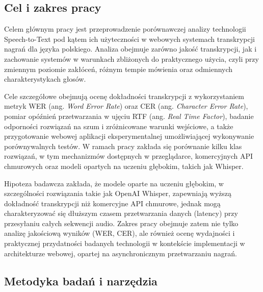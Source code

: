 \subsection*{Cel i zakres pracy}


Celem głównym pracy jest przeprowadzenie porównawczej analizy technologii Speech-to-Text pod kątem ich użyteczności w webowych systemach transkrypcji nagrań dla języka polskiego. Analiza obejmuje zarówno jakość transkrypcji, jak i zachowanie systemów w warunkach zbliżonych do praktycznego użycia, czyli przy zmiennym poziomie zakłóceń, różnym tempie mówienia oraz odmiennych charakterystykach głosów.

Cele szczegółowe obejmują ocenę dokładności transkrypcji z wykorzystaniem metryk WER (ang. \textit{Word Error Rate}) oraz CER (ang. \textit{Character Error Rate}), pomiar opóźnień przetwarzania w ujęciu RTF (ang. \textit{Real Time Factor}), badanie odporności rozwiązań na szum i zróżnicowane warunki wejściowe, a także przygotowanie webowej aplikacji eksperymentalnej umożliwiającej wykonywanie porównywalnych testów. W ramach pracy zakłada się porównanie kilku klas rozwiązań, w tym mechanizmów dostępnych w przeglądarce, komercyjnych API chmurowych oraz modeli opartych na uczeniu głębokim, takich jak Whisper.

Hipoteza badawcza zakłada, że modele oparte na uczeniu głębokim, w szczególności rozwiązania takie jak OpenAI Whisper, zapewniają wyższą dokładność transkrypcji niż komercyjne API chmurowe, jednak mogą charakteryzować się dłuższym czasem przetwarzania danych (latency) przy przesyłaniu całych sekwencji audio. Zakres pracy obejmuje zatem nie tylko analizę jakościową wyników (WER, CER), ale również ocenę wydajności i praktycznej przydatności badanych technologii w kontekście implementacji w architekturze webowej, opartej na asynchronicznym przetwarzaniu nagrań.

\subsection*{Metodyka badań i narzędzia}

